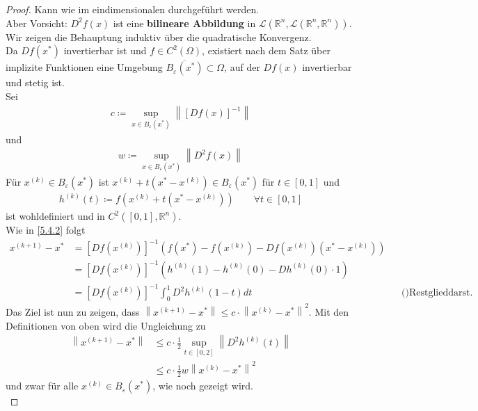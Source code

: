\documentclass[ngerman,fontsize=11pt, paper=a4, parskip=half, titlepage=true, toc=bib]{scrbook}
\newcommand{\Ren}{\mathds{R}^{n}}
\newcommand{\nn}[1]{\left\| #1 \right\|}
\begin{document}
 		\begin{proof}
 			Kann wie im eindimensionalen durchgeführt werden.\\
 			Aber Vorsicht: $D^2f(x)$ ist eine \textbf{bilineare Abbildung} in 
 			$\mathcal{L}(\Ren, \mathcal{L}(\Ren, \Ren))$. \\
 			
 			Wir zeigen die Behauptung induktiv über die quadratische Konvergenz.\\
 			Da $Df(x^{*})$ invertierbar ist und $f\in C^2(\Omega) $,
 			existiert nach dem Satz über implizite Funktionen
 			eine Umgebung $\overline{B_\varepsilon(x^{*})}\subset \Omega$,
 			auf der $Df(x)$ invertierbar und stetig ist.\\
 			Sei 
 			\begin{gather*}
 				c\coloneqq \sup_{x\in B_\varepsilon(x^{*})} \nn{[Df(x)]^{-1}}
 			\end{gather*}
 			und 
 			\begin{gather*}
 				w\coloneqq \sup_{x\in B_\varepsilon(x^{*})}\nn{D^2f(x)}
 			\end{gather*}
 			Für $x^{(k)}\in B_\varepsilon(x^{*}) $ ist $x^{(k)}+t(x^{*}-x^{(k)})\in B_\varepsilon(x^{*})$
 			für $t\in [0,1]$ und 
 			\begin{gather*}
 				h^{(k)}(t) \coloneqq f(x^{(k)}+ t(x^{*}-x^{(k)}))\qquad \forall t\in [0,1]
 			\end{gather*}
 			ist wohldefiniert und in $C^2([0,1], \Ren)$.\\
 			Wie in \ref{5.4.2} folgt 
 			\begin{align*}
 				x^{(k+1)}-x^{*} &= [Df(x^{(k)})]^{-1}\left(f(x^{*})-f(x^{(k)})-Df(x^{(k)})(x^{*}-x^{(k)})\right)\\
 				&= [Df(x^{(k)})]^{-1}\left( h^{(k)}(1)-h^{(k)}(0)-Dh^{(k)}(0)\cdot 1\right)\\
 				&= [Df(x^{(k)})]^{-1} \int_{0}^{1}D^2h^{(k)}(1-t)dt &&\text{()Restglieddarst. der Taylorentw.)}
 			\end{align*}
 			Das Ziel ist nun zu zeigen, dass $\nn{x^{(k+1)}-x^{*}} \leq c\cdot \nn{x^{(k)}-x^{*}}^2$.
 			Mit den Definitionen von oben wird die Ungleichung zu
 			\begin{align}\nonumber
 				\nn{x^{(k+1)}-x^{*}} &\leq c\cdot \frac{1}{2} \sup_{t\in[0,2]} \nn{D^2h^{(k)}(t)} \\
 						& \leq c\cdot \frac{1}{2} w\nn{x^{(k)}-x^{*}}^2
 						\label{V.5.5}
 			\end{align}
 			und zwar für alle $x^{(k)}\in B_\varepsilon(x^{*})$, wie noch gezeigt wird.\\

\end{proof}
\end{document}

